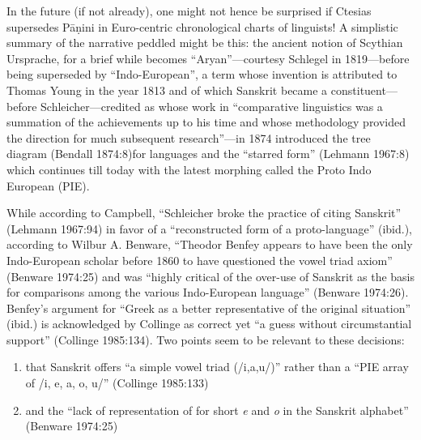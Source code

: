 In the future (if not already), one might not hence be surprised if Ctesias supersedes Pāṇini in Euro-centric chronological charts of linguists! A simplistic summary of the narrative peddled might be this: the ancient notion of Scythian Ursprache, for a brief while becomes “Aryan”—courtesy Schlegel in 1819—before being superseded by “Indo-European”, a term whose invention is attributed to Thomas Young in the year 1813 and of which Sanskrit became a constituent—before Schleicher—credited as whose work in “comparative linguistics was a summation of the achievements up to his time and whose methodology provided the direction for much subsequent research”—in 1874 introduced the tree diagram (Bendall 1874:8)for languages and the “starred form” (Lehmann 1967:8) which continues till today with the latest morphing called the Proto Indo European (PIE).

While according to Campbell, “Schleicher broke the practice of citing Sanskrit” (Lehmann 1967:94) in favor of a “reconstructed form of a proto-language” (ibid.), according to Wilbur A. Benware, “Theodor Benfey appears to have been the only Indo-European scholar before 1860 to have questioned the vowel triad axiom” (Benware 1974:25) and was “highly critical of the over-use of Sanskrit as the basis for comparisons among the various Indo-European language” (Benware 1974:26). Benfey’s argument for “Greek as a better representative of the original situation” (ibid.) is acknowledged by Collinge as correct yet “a guess without circumstantial support” (Collinge 1985:134). Two points seem to be relevant to these decisions:

\begin{enumerate}
\item that Sanskrit offers “a simple vowel triad (/i,a,u/)” rather than a “PIE array of /i, e, a, o, u/” (Collinge 1985:133)

 \item and the “lack of representation of for short \textit{e} and \textit{o} in the Sanskrit alphabet” (Benware 1974:25)

\end{enumerate}

